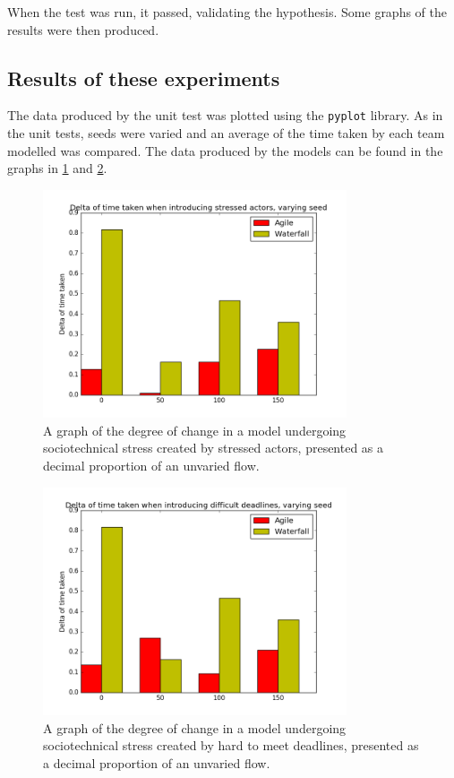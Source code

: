 When the test was run, it passed, validating the hypothesis. Some graphs of the results were then produced. \par

\subsection{Results of these experiments}
\label{experimental_results}
The data produced by the unit test was plotted using the \texttt{pyplot} library\cite{Overv50:online}. As in the unit tests, seeds were varied and an average of the time taken by each team modelled was compared. The data produced by the models can be found in the graphs in \cref{fig:stress_results_graph} and \cref{fig:deadlines_results_graph}.  \par

\begin{figure}[p]
    \centering
    \includegraphics[width=0.8\textwidth]{images/mutate_stressed.png}
    \caption{A graph of the degree of change in a model undergoing sociotechnical stress created by stressed actors, presented as a decimal proportion of an unvaried flow.}
    \label{fig:stress_results_graph}
\end{figure} \par

\begin{figure}[p]
    \centering
    \includegraphics[width=0.8\textwidth]{images/mutate_deadline.png}
    \caption{A graph of the degree of change in a model undergoing sociotechnical stress created by hard to meet deadlines, presented as a decimal proportion of an unvaried flow.}
    \label{fig:deadlines_results_graph}
\end{figure} \par

